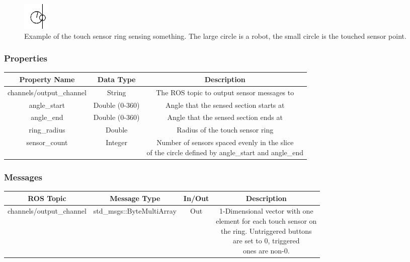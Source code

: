 \begin{itemize}
	\begin{figure}[h]
		\centering
		\includegraphics{./images_design/touch_sensor}
		\caption{Example of the touch sensor ring sensing something. The large circle is a robot, the small circle is the touched sensor point.}
		\label{fig:touchsensorexample}
	\end{figure}
\subsubsection*{Properties}
\begin{tabular}{c|c|c}
Property Name & Data Type & Description\\ \hline \hline
channels/output\_channel & String & The ROS topic to output sensor messages to\\ \hline
angle\_start & Double (0-360) & Angle that the sensed section starts at\\ \hline
angle\_end & Double (0-360) & Angle that the sensed section ends at\\ \hline
ring\_radius & Double & Radius of the touch sensor ring\\ \hline
sensor\_count & Integer & \makecell{Number of sensors spaced evenly in the slice\\ of the circle defined by angle\_start and angle\_end}
\end{tabular}

\subsubsection*{Messages}
\begin{tabular}{c|c|c|c}
ROS Topic & Message Type & In/Out & Description\\ \hline \hline
channels/output\_channel & std\_msgs::ByteMultiArray & Out & \makecell{1-Dimensional vector with one\\ element for each touch sensor on\\ the ring. Untriggered buttons\\ are set to 0, triggered\\ ones are non-0.}
\end{tabular}


\end{itemize}
